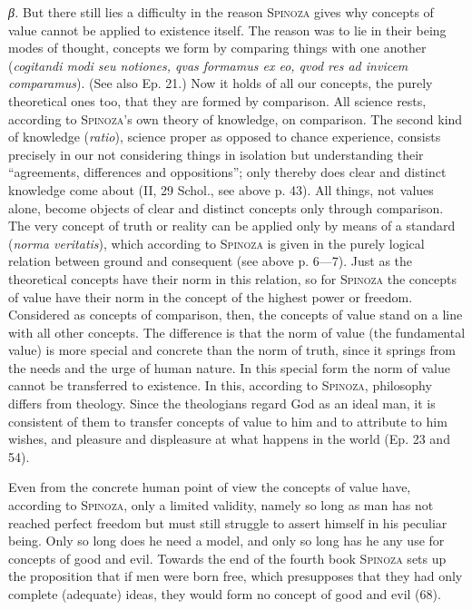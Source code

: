 \documentclass[12pt]{article}
\newcommand{\opage}[1]{\marginnote{\footnotesize\textit{[#1]}}}
\begin{document}
\textit{β.} But there still lies a difficulty in the reason \textsc{Spinoza} gives why concepts of
value cannot be applied to existence itself. The reason was to lie in their being modes of thought,
concepts we form by comparing things with one another (\textit{cogitandi modi seu notiones, qvas
formamus ex eo, qvod res ad invicem comparamus}). %
(See also Ep. 21.) Now it holds of all our concepts, the purely theoretical ones too, that they are
formed by comparison. All science rests, according to \textsc{Spinoza}'s own theory of knowledge, on
comparison. The second kind of knowledge (\textit{ratio}), science proper as opposed to chance
experience, consists precisely in our not considering things in isolation but understanding their
``agreements, differences and oppositions''; only thereby does clear and distinct knowledge come
about (II, 29 Schol., see above p. 43). All things, not values alone, become objects of clear and
distinct concepts only through comparison. The very concept of truth or reality can be applied only
by means of a standard (\textit{norma veritatis}), which according to \textsc{Spinoza} is given in
the purely logical relation between ground and consequent (see above p. 6---7). Just as the
theoretical concepts have their norm in this relation, so for \textsc{Spinoza} the concepts of value
have their norm in the concept of the highest power or freedom. Considered as concepts of
comparison, then, the concepts of value stand on a line with all other concepts. The difference is
that the norm of value (the fundamental value) is more special and concrete than the norm of truth,
since it springs from the needs and the urge of human nature. In this special form the norm of
value cannot be transferred to existence. In this, according to \textsc{Spinoza}, philosophy
differs from theology. Since the theologians regard God as an ideal man, it is consistent of them to
transfer concepts of value to him and to attribute to him wishes, and pleasure and displeasure at
what happens in the world (Ep. 23 and 54).

Even from the concrete human point of view the concepts of value have, according to
\textsc{Spinoza}, only a limited validity, namely so long as man has not reached \opage{72}perfect
freedom but must still struggle to assert himself in his peculiar being. Only so long does he need
a model, and only so long has he any use for concepts of good and evil. Towards the end of the
fourth book \textsc{Spinoza} sets up the proposition that if men were born free, which presupposes
that they had only complete (adequate) ideas, they would form no concept of good and evil (68).
\end{document}
